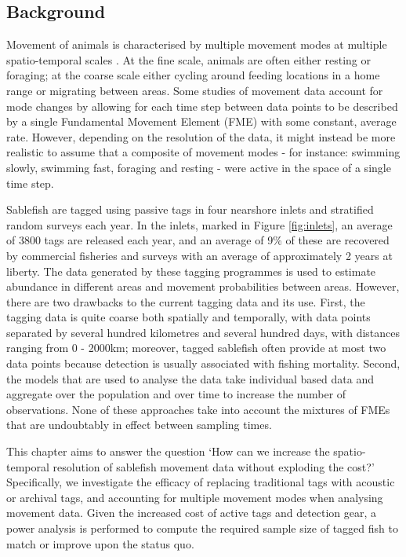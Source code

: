 \documentclass{article}
\begin{document}
\subsection{Background}

Movement of animals is characterised by multiple movement modes at multiple spatio-temporal scales \citep{nathan2008movement,fryxell2008multiple}. At the fine scale, animals are often either resting or foraging; at the coarse scale either cycling around feeding locations in a home range or migrating between areas. Some studies of movement data account for mode changes by allowing for each time step between data points to be described by a single Fundamental Movement Element (FME) with some constant, average rate. However, depending on the resolution of the data, it might instead be more realistic to assume that a composite of movement modes - for instance: swimming slowly, swimming fast, foraging and resting - were active in the space of a single time step. 

Sablefish are tagged using passive tags in four nearshore inlets and stratified random surveys each year. In the inlets, marked in Figure \ref{fig:inlets}, an average of 3800 tags are released each year, and an average of 9\% of these are recovered by commercial fisheries and surveys with an average of approximately 2 years at liberty. The data generated by these tagging programmes is used to estimate abundance in different areas and movement probabilities between areas. However, there are two drawbacks to the current tagging data and its use. First, the tagging data is quite coarse both spatially and temporally, with data points separated by several hundred kilometres and several hundred days, with distances ranging from 0 - 2000km; moreover, tagged sablefish often provide at most two data points because detection is usually associated with fishing mortality. Second, the models that are used to analyse the data take individual based data and aggregate over the population and over time to increase the number of observations. None of these approaches take into account the mixtures of FMEs that are undoubtably in effect between sampling times.

This chapter aims to answer the question `How can we increase the spatio-temporal resolution of sablefish movement data without exploding the cost?' Specifically, we investigate the efficacy of replacing traditional tags with acoustic or archival tags, and accounting for multiple movement modes when analysing movement data. Given the increased cost of active tags and detection gear, a power analysis is performed to compute the required sample size of tagged fish to match or improve upon the status quo.
\end{document}
